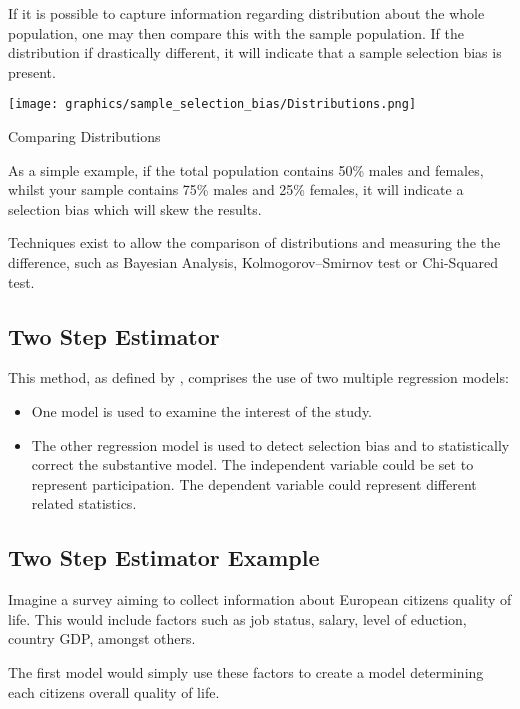 	If it is possible to capture information regarding distribution about the whole population, one may then compare this with the sample population. If the distribution if drastically different, it will indicate that a sample selection bias is present.
	
	\begin{marginfigure}
	\centering
  		\texttt{[image: graphics/sample\_selection\_bias/Distributions.png]}
  		\caption{Comparing Distributions}
  		\label{fig:comparing-distributions}
	\end{marginfigure}

As a simple example, if the total population contains 50\% males and females, whilst your sample contains 75\% males and 25\% females, it will indicate a selection bias which will skew the results.

Techniques exist to allow the comparison of distributions and measuring the the difference, such as Bayesian Analysis, Kolmogorov--Smirnov test or Chi-Squared test. \citep{GriffinEtAl2013}

	\subsection{Two Step Estimator}
	
	This method, as defined by \citet{Heckman1979}, comprises the use of two multiple regression models:
	
	\begin{itemize}
		\item One model is used to examine the interest of the study.
		\item The other regression model is used to detect selection bias and to statistically correct the substantive model. The independent variable could be set to represent participation. The  dependent variable could represent different related statistics.
	\end{itemize}
	
	\subsection{Two Step Estimator Example}
	
	Imagine a survey aiming to collect information about European citizens quality of life. This would include factors such as job status, salary, level of eduction, country GDP, amongst others.
	
The first model would simply use these factors to create a model determining each citizens overall quality of life.

